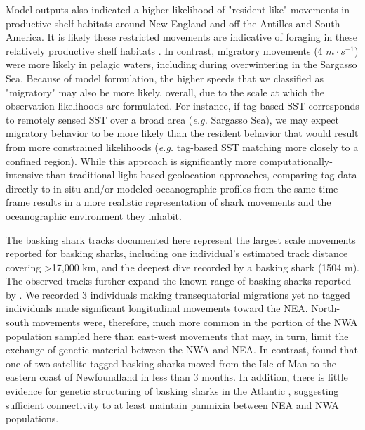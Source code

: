 Model outputs also indicated a higher likelihood of "resident-like" movements in productive shelf habitats around New England and off the Antilles and South America. It is likely these restricted movements are indicative of foraging in these relatively productive shelf habitats \citep{Mourato2014}. In contrast, migratory movements (4 $m \cdot s^{-1}$) were more likely in pelagic waters, including during overwintering in the Sargasso Sea. Because of model formulation, the higher speeds that we classified as "migratory" may also be more likely, overall, due to the scale at which the observation likelihoods are formulated. For instance, if tag-based SST corresponds to remotely sensed SST over a broad area (\emph{e.g.} Sargasso Sea), we may expect migratory behavior to be more likely than the resident behavior that would result from more constrained likelihoods (\emph{e.g.} tag-based SST matching more closely to a confined region). While this approach is significantly more computationally-intensive than traditional light-based geolocation approaches, comparing tag data directly to in situ and/or modeled oceanographic profiles from the same time frame results in a more realistic representation of shark movements and the oceanographic environment they inhabit.

The basking shark tracks documented here represent the largest scale movements reported for basking sharks, including one individual's estimated track distance covering >17,000 km, and the deepest dive recorded by a basking shark (1504 m). The observed tracks further expand the known range of basking sharks reported by \citet{Skomal2009}. We recorded 3 individuals making transequatorial migrations yet no tagged individuals made significant longitudinal movements toward the NEA. North-south movements were, therefore, much more common in the portion of the NWA population sampled here than east-west movements that may, in turn, limit the exchange of genetic material between the NWA and NEA. In contrast, \citet{Gore2008} found that one of two satellite-tagged basking sharks moved from the Isle of Man to the eastern coast of Newfoundland in less than 3 months. In addition, there is little evidence for genetic structuring of basking sharks in the Atlantic \citet{Hoelzel2006}, suggesting sufficient connectivity to at least maintain panmixia between NEA and NWA populations.

